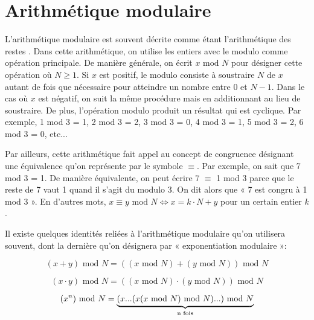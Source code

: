 \section{Arithmétique modulaire} 
L'arithmétique modulaire est souvent décrite comme étant l'arithmétique des restes \cite{10.5555/31026}. Dans cette arithmétique, on utilise les entiers avec le modulo comme opération principale. De manière générale, on écrit $x \text{ mod } N$ pour désigner cette opération où $N \geq 1$. Si $x$ est positif, le modulo consiste à soustraire $N$ de $x$ autant de fois que nécessaire pour atteindre un nombre entre 0 et $N-1$. Dans le cas où $x$ est négatif, on suit la même procédure mais en additionnant au lieu de soustraire. De plus, l'opération modulo produit un résultat qui est cyclique. Par exemple, 1 mod 3 = 1, 2 mod 3 = 2, 3 mod 3 = 0, 4 mod 3 = 1, 5 mod 3 = 2, 6 mod 3 = 0, etc... 

Par ailleurs, cette arithmétique fait appel au concept de congruence désignant une équivalence qu'on représente par le symbole $\equiv$. Par exemple, on sait que 7 mod 3 = 1. De manière équivalente, on peut écrire 7 $\equiv$ 1 mod 3  parce que le reste de 7 vaut 1 quand il s'agit du modulo 3. On dit alors que « 7 est congru à 1 mod 3 ». En d'autres mots, $x \equiv y \text{ mod } N \iff x = k\cdot N + y$ pour un certain entier $k$.

Il existe quelques identités reliées à l'arithmétique modulaire qu'on utilisera souvent, dont la dernière qu'on désignera par « exponentiation modulaire »: 

\begin{equation}
    (x + y) \text{ mod } N = ((x \text{ mod } N) + (y \text{ mod } N)) \text{ mod } N
\end{equation}

\begin{equation}
    (x\cdot y) \text{ mod } N = ((x \text{ mod } N) \cdot (y \text{ mod } N)) \text{ mod } N
\end{equation}

\begin{equation}
    (x^n) \text{ mod } N = \underbrace{(x ...(x(x \text{ mod } N) \text{ mod } N) ...) \text{ mod } N}_\text{n \text{fois}} 
\end{equation}

